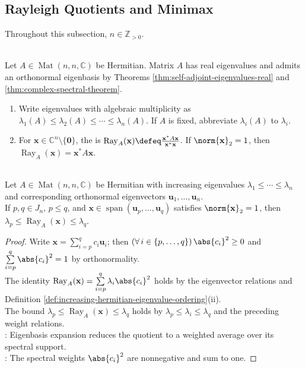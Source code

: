 \subsection{Rayleigh Quotients and Minimax}

Throughout this subsection, $n\in\mathbb{Z}_{>0}$.

\begin{definition} \label{def:increasing-hermitian-eigenvalue-ordering} \\
Let $A\in\operatorname{Mat}(n,n,\mathbb{C})$ be Hermitian. Matrix $A$ has real eigenvalues and admits an orthonormal eigenbasis by Theorems \ref{thm:self-adjoint-eigenvalues-real} and \ref{thm:complex-spectral-theorem}.
\begin{enumerate}[label=(\roman*)]
\setlength{\itemsep}{0pt}
\item Write eigenvalues with algebraic multiplicity as $\lambda_1(A)\leq\lambda_2(A)\leq\cdots\leq\lambda_n(A)$. If $A$ is fixed, abbreviate $\lambda_i(A)$ to $\lambda_i$.
\item For $\mathbf{x}\in\mathbb{C}^n\setminus\{\mathbf{0}\}$, the  is $\operatorname{Ray}_A(\mathbf{x})\defeq\frac{\mathbf{x}^*A\mathbf{x}}{\mathbf{x}^*\mathbf{x}}$. If $\norm{\mathbf{x}}_2=1$, then $\operatorname{Ray}_A(\mathbf{x})=\mathbf{x}^*A\mathbf{x}$.
\end{enumerate}
\end{definition}

\begin{theorem} \label{thm:rayleigh-quotient-spectral-interval} \\
Let $A\in\operatorname{Mat}(n,n,\mathbb{C})$ be Hermitian with increasing eigenvalues $\lambda_1\leq\cdots\leq\lambda_n$ and corresponding orthonormal eigenvectors $\mathbf{u}_1,\ldots,\mathbf{u}_n$.\\
If $p,q\in J_n$, $p\leq q$, and $\mathbf{x}\in\operatorname{span}(\mathbf{u}_p,\ldots,\mathbf{u}_q)$ satisfies $\norm{\mathbf{x}}_2=1$, then $\lambda_p\leq\operatorname{Ray}_A(\mathbf{x})\leq\lambda_q$.
\begin{proof}
Write $\mathbf{x}=\sum\limits_{i=p}^{q}c_i\mathbf{u}_i$; then $(\forall\,i\in\{p,\ldots,q\})\,\abs{c_i}^2\geq0$ and $\sum\limits_{i=p}^{q}\abs{c_i}^2=1$ by orthonormality.\\
The identity $\operatorname{Ray}_A(\mathbf{x})=\sum\limits_{i=p}^{q}\lambda_i\abs{c_i}^2$ holds by the eigenvector relations and Definition \ref{def:increasing-hermitian-eigenvalue-ordering}(ii).\\
The bound $\lambda_p\leq\operatorname{Ray}_A(\mathbf{x})\leq\lambda_q$ holds by $\lambda_p\leq\lambda_i\leq\lambda_q$ and the preceding weight relations.\\
: Eigenbasis expansion reduces the quotient to a weighted average over its spectral support.\\
: The spectral weights $\abs{c_i}^2$ are nonnegative and sum to one.
\end{proof}
\end{theorem}

